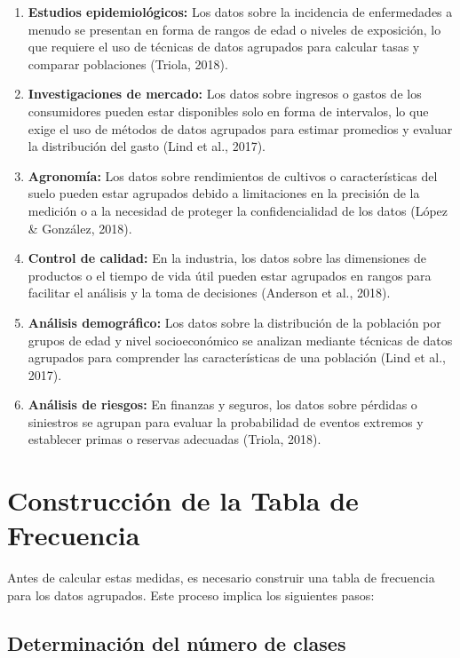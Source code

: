 \documentclass[
  spanish,
  letterpaper,
]{book}
\begin{document}
\begin{enumerate}
\def\labelenumi{\arabic{enumi}.}
\item
  \textbf{Estudios epidemiológicos:} Los datos sobre la incidencia de
  enfermedades a menudo se presentan en forma de rangos de edad o
  niveles de exposición, lo que requiere el uso de técnicas de datos
  agrupados para calcular tasas y comparar poblaciones (Triola, 2018).
\item
  \textbf{Investigaciones de mercado:} Los datos sobre ingresos o gastos
  de los consumidores pueden estar disponibles solo en forma de
  intervalos, lo que exige el uso de métodos de datos agrupados para
  estimar promedios y evaluar la distribución del gasto (Lind et al.,
  2017).
\item
  \textbf{Agronomía:} Los datos sobre rendimientos de cultivos o
  características del suelo pueden estar agrupados debido a limitaciones
  en la precisión de la medición o a la necesidad de proteger la
  confidencialidad de los datos (López \& González, 2018).
\item
  \textbf{Control de calidad:} En la industria, los datos sobre las
  dimensiones de productos o el tiempo de vida útil pueden estar
  agrupados en rangos para facilitar el análisis y la toma de decisiones
  (Anderson et al., 2018).
\item
  \textbf{Análisis demográfico:} Los datos sobre la distribución de la
  población por grupos de edad y nivel socioeconómico se analizan
  mediante técnicas de datos agrupados para comprender las
  características de una población (Lind et al., 2017).
\item
  \textbf{Análisis de riesgos:} En finanzas y seguros, los datos sobre
  pérdidas o siniestros se agrupan para evaluar la probabilidad de
  eventos extremos y establecer primas o reservas adecuadas (Triola,
  2018).
\end{enumerate}

\section{Construcción de la Tabla de
Frecuencia}\label{construcciuxf3n-de-la-tabla-de-frecuencia}

Antes de calcular estas medidas, es necesario construir una tabla de
frecuencia para los datos agrupados. Este proceso implica los siguientes
pasos:

\subsection{Determinación del número de
clases}\label{determinaciuxf3n-del-nuxfamero-de-clases}
\end{document}
